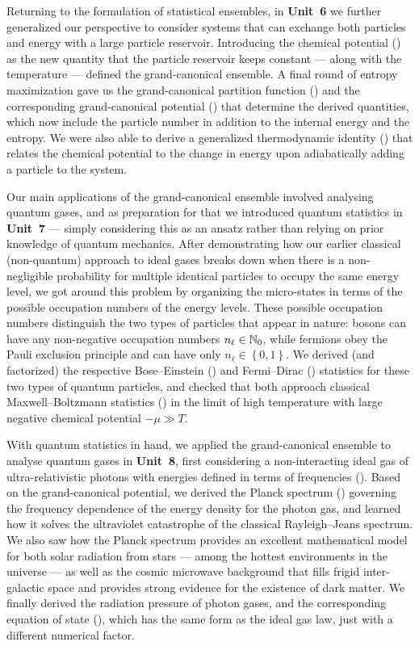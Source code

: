 Returning to the formulation of statistical ensembles, in \textbf{Unit~6} we further generalized our perspective to consider systems that can exchange both particles and energy with a large particle reservoir.
Introducing the chemical potential () as the new quantity that the particle reservoir keeps constant --- along with the temperature --- defined the grand-canonical ensemble.
A final round of entropy maximization gave us the grand-canonical partition function () and the corresponding grand-canonical potential () that determine the derived quantities, which now include the particle number in addition to the internal energy and the entropy.
We were also able to derive a generalized thermodynamic identity () that relates the chemical potential to the change in energy upon adiabatically adding a particle to the system.

Our main applications of the grand-canonical ensemble involved analysing quantum gases, and as preparation for that we introduced quantum statistics in \textbf{Unit~7} --- simply considering this as an ansatz rather than relying on prior knowledge of quantum mechanics.
After demonstrating how our earlier classical (non-quantum) approach to ideal gases breaks down when there is a non-negligible probability for multiple identical particles to occupy the same energy level, we got around this problem by organizing the micro-states in terms of the possible occupation numbers of the energy levels.
These possible occupation numbers distinguish the two types of particles that appear in nature: bosons can have any non-negative occupation numbers $n_{\ell} \in \mathbb N_0$, while fermions obey the Pauli exclusion principle and can have only $n_{\ell} \in \left\{0, 1\right\}$.
We derived (and factorized) the respective Bose--Einstein () and Fermi--Dirac () statistics for these two types of quantum particles, and checked that both approach classical Maxwell--Boltzmann statistics () in the limit of high temperature with large negative chemical potential $-\mu \gg T$.

With quantum statistics in hand, we applied the grand-canonical ensemble to analyse quantum gases in \textbf{Unit~8}, first considering a non-interacting ideal gas of ultra-relativistic photons with energies defined in terms of frequencies ().
Based on the grand-canonical potential, we derived the Planck spectrum () governing the frequency dependence of the energy density for the photon gas, and learned how it solves the ultraviolet catastrophe of the classical Rayleigh--Jeans spectrum.
We also saw how the Planck spectrum provides an excellent mathematical model for both solar radiation from stars --- among the hottest environments in the universe --- as well as the cosmic microwave background that fills frigid inter-galactic space and provides strong evidence for the existence of dark matter.
We finally derived the radiation pressure of photon gases, and the corresponding equation of state (), which has the same form as the ideal gas law, just with a different numerical factor.

